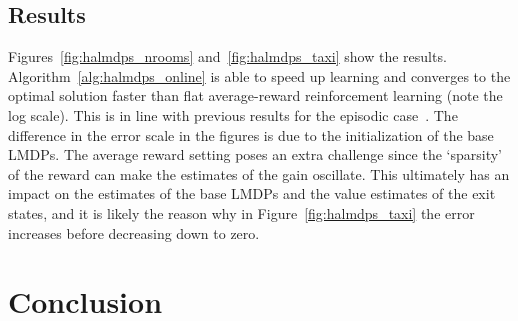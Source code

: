 \subsection{Results}
Figures~\ref{fig:halmdps_nrooms} and~\ref{fig:halmdps_taxi} show the results. Algorithm~\ref{alg:halmdps_online} is able to speed up 
learning and converges to the optimal solution faster than flat average-reward reinforcement learning (note the log scale). This is in line with previous results for the episodic case~\citep{Infante2022}. The difference in the error scale in the figures is due to the initialization of the base LMDPs. The average reward setting poses an extra challenge since the `sparsity' of the reward can make the estimates of the gain oscillate. This ultimately has an impact on the estimates of the base LMDPs and the value estimates of the exit states, and it is likely the reason why in Figure~\ref{fig:halmdps_taxi} the error increases before decreasing down to zero.






\section{Conclusion}

